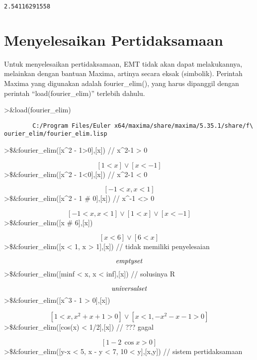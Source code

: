 \documentclass[
]{book}
\begin{document}
\begin{verbatim}
2.54116291558
\end{verbatim}

\chapter{Menyelesaikan Pertidaksamaan}\label{menyelesaikan-pertidaksamaan}

Untuk menyelesaikan pertidaksamaan, EMT tidak akan dapat melakukannya, melainkan dengan bantuan Maxima, artinya secara eksak (simbolik). Perintah Maxima yang digunakan adalah fourier\_elim(), yang harus dipanggil dengan perintah ``load(fourier\_elim)'' terlebih dahulu.

\textgreater\&load(fourier\_elim)

\begin{verbatim}
        C:/Program Files/Euler x64/maxima/share/maxima/5.35.1/share/f\
ourier_elim/fourier_elim.lisp
\end{verbatim}

\textgreater\$\&fourier\_elim({[}x\^{}2 - 1\textgreater0{]},{[}x{]}) // x\^{}2-1 \textgreater{} 0

\[\left[ 1<x \right] \lor \left[ x<-1 \right] \]\textgreater\$\&fourier\_elim({[}x\^{}2 - 1\textless0{]},{[}x{]}) // x\^{}2-1 \textless{} 0

\[\left[ -1<x , x<1 \right] \]\textgreater\$\&fourier\_elim({[}x\^{}2 - 1 \# 0{]},{[}x{]}) // x\^{}-1 \textless\textgreater{} 0

\[\left[ -1<x , x<1 \right] \lor \left[ 1<x \right] \lor \left[ x<-1
  \right] \]\textgreater\$\&fourier\_elim({[}x \# 6{]},{[}x{]})

\[\left[ x<6 \right] \lor \left[ 6<x \right] \]\textgreater\$\&fourier\_elim({[}x \textless{} 1, x \textgreater{} 1{]},{[}x{]}) // tidak memiliki penyelesaian

\[{\it emptyset}\]\textgreater\$\&fourier\_elim({[}minf \textless{} x, x \textless{} inf{]},{[}x{]}) // solusinya R

\[{\it universalset}\]\textgreater\$\&fourier\_elim({[}x\^{}3 - 1 \textgreater{} 0{]},{[}x{]})

\[\left[ 1<x , x^2+x+1>0 \right] \lor \left[ x<1 , -x^2-x-1>0
  \right] \]\textgreater\$\&fourier\_elim({[}cos(x) \textless{} 1/2{]},{[}x{]}) // ??? gagal

\[\left[ 1-2\,\cos x>0 \right] \]\textgreater\$\&fourier\_elim({[}y-x \textless{} 5, x - y \textless{} 7, 10 \textless{} y{]},{[}x,y{]}) // sistem pertidaksamaan
\end{document}
